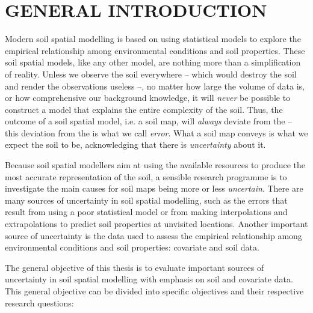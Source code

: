 \artigofalse
\chapter{GENERAL INTRODUCTION}
\label{chap:chap01}
\setcounter{page}{1}

Modern soil spatial modelling is based on using statistical models to explore the empirical relationship among 
environmental conditions and soil properties. These soil spatial models, like any other model, are nothing 
more than a simplification of reality. Unless we observe the soil everywhere -- which would destroy the 
soil and render the observations useless --, no matter how large the volume of data is, or how comprehensive 
our background knowledge, it will \emph{never} be possible to construct a model that explains the entire 
complexity of the soil. Thus, the outcome of a soil spatial model, i.e. a soil map, will \emph{always} deviate 
from the  -- this deviation from the  is what we call \emph{error}. What a soil map conveys 
is what we expect the soil to be, acknowledging that there is \emph{uncertainty} about it.

Because soil spatial modellers aim at using the available resources to produce the most accurate 
representation of the soil, a sensible research programme is to investigate the main causes for soil maps 
being more or less \emph{uncertain}. There are many sources of uncertainty in soil spatial modelling, such as 
the errors that result from using a poor statistical model or from making interpolations and extrapolations 
to predict soil properties at unvisited locations. Another important source of uncertainty is the data used to 
assess the empirical relationship among environmental conditions and soil properties: covariate and soil data.

The general objective of this thesis is to evaluate important sources of uncertainty in soil spatial modelling 
with emphasis on soil and covariate data. This general objective can be divided into specific objectives and 
their respective research questions:

